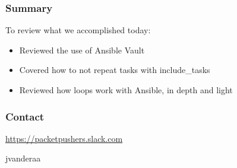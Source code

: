\documentclass[aspectratio=169]{beamer}
\begin{document}
\begin{frame}
  \frametitle{Summary}
    To review what we accomplished today:
    \begin{itemize}
      \item <2-> Reviewed the use of Ansible Vault
      \item <3-> Covered how to not repeat tasks with include\_tasks
      \item <4-> Reviewed how loops work with Ansible, in depth and light
    \end{itemize}
\end{frame}

\begin{frame}
    \frametitle{Contact}
    \huge
    \begin{center}
      \url{https://packetpushers.slack.com}
    \end{center}
    \begin{center}
      \normalsize
      \faSlack \hspace{.1cm}jvanderaa  
    \end{center}
  \end{frame}
\end{document}
